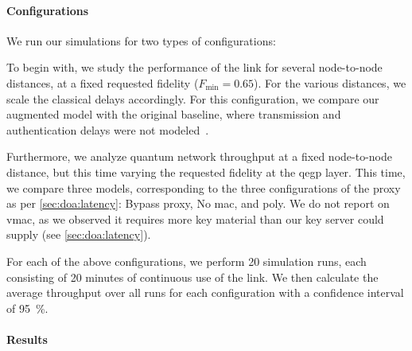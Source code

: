\paragraph{Configurations}

We run our simulations for two types of configurations:
%
\begin{inlinelist}
    \item To begin with, we study the performance of the link for several node-to-node distances, at
          a fixed requested fidelity ($F_\text{min}=0.65$). For the various distances, we scale the
          classical delays accordingly. For this configuration, we compare our augmented model with
          the original baseline, where transmission and authentication delays were not
          modeled~\cite{dahlberg_2019_egp}.
    \item Furthermore, we analyze quantum network throughput at a fixed node-to-node distance, but
          this time varying the requested fidelity at the \acrshort{qegp} layer. This time, we
          compare three models, corresponding to the three configurations of the proxy as per
          \cref{sec:doa:latency}: Bypass proxy, No \acrshort{mac}, and \acrshort{poly}. We do not
          report on \acrshort{vmac}, as we observed it requires more key material than our key
          server could supply (see \cref{sec:doa:latency}).
\end{inlinelist}

For each of the above configurations, we perform \num{20} simulation runs, each consisting of
\num{20} minutes of continuous use of the link. We then calculate the average throughput over all
runs for each configuration with a confidence interval of \qty{95}{\percent}.

\paragraph{Results}

